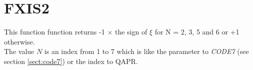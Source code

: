 \section{FXIS2}
\label{sect:fxis2}

\noindent This function function returns -1 $\times$ the sign of $\xi$ for N
= 2, 3, 5 and 6 or +1 otherwise.\\

\noindent The value $N$ is an index from 1 to 7 which is like the parameter
to {\em CODE7} (see section \ref{sect:code7}) or the index to QAPR.\\

